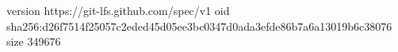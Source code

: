 version https://git-lfs.github.com/spec/v1
oid sha256:d26f7514f25057c2eded45d05ee3bc0347d0ada3efde86b7a6a13019b6c38076
size 349676
